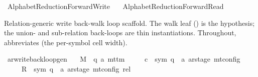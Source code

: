 %
\begin{isabellebody}%
%
%
\isadelimtheory
%
\endisadelimtheory
%
\isatagtheory
{}\isamarkupfalse%
\ AlphabetReduction{\isacharunderscore}{\kern0pt}ForwardWrite\isanewline
\ \ \ AlphabetReduction{\isacharunderscore}{\kern0pt}ForwardRead\isanewline
{}%
\endisatagtheory
{\isafoldtheory}%
%
\isadelimtheory
%
\endisadelimtheory
%
\isadelimdocument
%
\endisadelimdocument
%
\isatagdocument
%
\isamarkuptrue%
%
\endisatagdocument
{\isafolddocument}%
%
\isadelimdocument
%
\endisadelimdocument
%
\begin{isamarkuptext}%
Relation-generic write back-walk loop scaffold.  The walk
  leaf () is the  hypothesis; the
  union- and sub-relation back-loops are thin instantiations.
  Throughout,  abbreviates  (the per-symbol cell width).%
\end{isamarkuptext}\isamarkuptrue%
\isamarkupfalse%
\ ar{\isacharunderscore}{\kern0pt}write{\isacharunderscore}{\kern0pt}back{\isacharunderscore}{\kern0pt}loop{\isacharunderscore}{\kern0pt}gen{\isacharcolon}{\kern0pt}\isanewline
\ \ \ M\ {\isacharcolon}{\kern0pt}{\isacharcolon}{\kern0pt}\ {\isachardoublequoteopen}{\isacharparenleft}{\kern0pt}{\isacharprime}{\kern0pt}q{\isacharcomma}{\kern0pt}\ {\isacharprime}{\kern0pt}a{\isacharparenright}{\kern0pt}\ mttm{\isachardoublequoteclose}\isanewline
\ \ \ \ \ c{}\ {\isacharcolon}{\kern0pt}{\isacharcolon}{\kern0pt}\ {\isachardoublequoteopen}{\isacharparenleft}{\kern0pt}sym{}{\isacharcomma}{\kern0pt}\ {\isacharprime}{\kern0pt}q\ {\isasymtimes}\ {\isacharprime}{\kern0pt}a\ ar{\isacharunderscore}{\kern0pt}stage{\isacharparenright}{\kern0pt}\ mt{\isacharunderscore}{\kern0pt}config{\isachardoublequoteclose}\isanewline
\ \ \ \ \ R{\isacharprime}{\kern0pt}\ {\isacharcolon}{\kern0pt}{\isacharcolon}{\kern0pt}\ {\isachardoublequoteopen}{\isacharparenleft}{\kern0pt}sym{}{\isacharcomma}{\kern0pt}\ {\isacharprime}{\kern0pt}q\ {\isasymtimes}\ {\isacharprime}{\kern0pt}a\ ar{\isacharunderscore}{\kern0pt}stage{\isacharparenright}{\kern0pt}\ mt{\isacharunderscore}{\kern0pt}config\ rel{\isachardoublequoteclose}\isanewline

\end{isabellebody}
